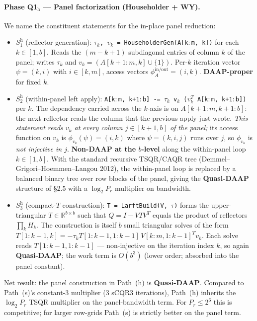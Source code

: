 \documentclass[11pt]{article}
\begin{document}
\paragraph{Phase Q1$_{\mathrm{h}}$ --- Panel factorization (Householder + WY).}
We name the constituent statements for the in-place panel reduction:
\begin{itemize}[leftmargin=2em]
  \item $S_1^{\mathrm{h}}$ (reflector generation):
        \texttt{$\tau_k$, $v_k$ = HouseholderGen(A[k$:$m, k])}
        for each $k \in [1,b]$. Reads the $(m-k+1)$ subdiagonal
        entries of column $k$ of the panel; writes
        $\tau_k$ and $v_k = (A[k+1{:}m, k] \cup \{1\})$. Per-$k$
        iteration vector $\psi = (k, i)$ with $i \in [k,m]$, access
        vectors $\phi_A^{\text{in/out}} = (i, k)$. \textbf{DAAP-proper}
        for fixed $k$.
  \item $S_2^{\mathrm{h}}$ (within-panel left apply):
        \texttt{A[k$:$m, k{+}1$:$b] -= $\tau_k$ v$_k$ ($v_k^T$ A[k$:$m, k{+}1$:$b])}
        per $k$. The dependency carried across the $k$-axis is
        on $A[k{+}1{:}m, k{+}1{:}b]$: the next reflector reads the
        column that the previous apply just wrote. \emph{This
        statement reads $v_k$ at every column $j \in [k+1, b]$ of the
        panel;} its access function on $v_k$ is
        $\phi_{v_k}(\psi) = (i, k)$ where $\psi = (k, i, j)$ runs over
        $j$, so $\phi_{v_k}$ is \emph{not injective in $j$}.
        \textbf{Non-DAAP at the $b$-level} along the within-panel
        loop $k \in [1,b]$. With the standard recursive TSQR/CAQR
        tree (Demmel--Grigori--Hoemmen--Langou 2012), the within-panel
        loop is replaced by a balanced binary tree over row blocks of
        the panel, giving the \textbf{Quasi-DAAP} structure of
        \S2.5 with a $\log_2 P_r$ multiplier on bandwidth.
  \item $S_3^{\mathrm{h}}$ (compact-$T$ construction):
        \texttt{T = LarftBuild(V, $\tau$)} forms the upper-triangular
        $T \in \mathbb{R}^{b \times b}$ such that $Q = I - V T V^T$
        equals the product of reflectors $\prod_k H_k$. The
        construction is itself $b$ small triangular solves of the
        form $T[1{:}k{-}1, k] = -\tau_k T[1{:}k{-}1, 1{:}k{-}1]\,
        V[k{:}m, 1{:}k{-}1]^T v_k$. Each solve reads
        $T[1{:}k{-}1, 1{:}k{-}1]$ — non-injective on the iteration
        index $k$, so again \textbf{Quasi-DAAP}; the work term is
        $O(b^3)$ (lower order; absorbed into the panel constant).
\end{itemize}
Net result: the panel construction in Path~(h) is \textbf{Quasi-DAAP}.
Compared to Path~(s)'s constant-3 multiplier (3 sCQR3 iterations),
Path~(h) inherits the $\log_2 P_r$ TSQR multiplier on the
panel-bandwidth term. For $P_r \le 2^6$ this is competitive; for
larger row-grids Path~(s) is strictly better on the panel term.
\end{document}
